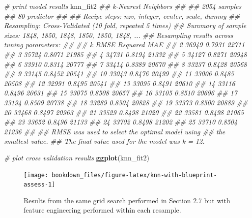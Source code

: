 \documentclass[]{krantz}
\makeatletter
\newenvironment{Shaded}{\begin{snugshade}}{\end{snugshade}}
\newcommand{\CommentTok}[1]{\textcolor[rgb]{0.37,0.37,0.37}{\textit{#1}}}
\newcommand{\KeywordTok}[1]{\textcolor[rgb]{0.27,0.27,0.27}{\textbf{#1}}}
\newcommand{\NormalTok}[1]{#1}
\newenvironment{kframe}{%
\medskip{}
\setlength{\fboxsep}{.8em}
 \def\at@end@of@kframe{}%
 \ifinner\ifhmode%
  \def\at@end@of@kframe{\end{minipage}}%
  \begin{minipage}{\columnwidth}%
 \fi\fi%
 \def\FrameCommand##1{\hskip\@totalleftmargin \hskip-\fboxsep
 \colorbox{shadecolor}{##1}\hskip-\fboxsep
     \hskip-\linewidth \hskip-\@totalleftmargin \hskip\columnwidth}%
 \MakeFramed {\advance\hsize-\width
   \@totalleftmargin\z@ \linewidth\hsize
   \@setminipage}}%
 {\par\unskip\endMakeFramed%
 \at@end@of@kframe}
\renewenvironment{Shaded}{\begin{kframe}}{\end{kframe}}
\makeatother
\begin{document}
\begin{Shaded}
\begin{Highlighting}[]
\CommentTok{# print model results}
\NormalTok{knn_fit2}
\CommentTok{## k-Nearest Neighbors }
\CommentTok{## }
\CommentTok{## 2054 samples}
\CommentTok{##   80 predictor}
\CommentTok{## }
\CommentTok{## Recipe steps: nzv, integer, center, scale, dummy }
\CommentTok{## Resampling: Cross-Validated (10 fold, repeated 5 times) }
\CommentTok{## Summary of sample sizes: 1848, 1850, 1848, 1850, 1850, 1848, ... }
\CommentTok{## Resampling results across tuning parameters:}
\CommentTok{## }
\CommentTok{##   k   RMSE   Rsquared  MAE  }
\CommentTok{##    2  36949  0.7931    22711}
\CommentTok{##    3  35724  0.8071    21985}
\CommentTok{##    4  34731  0.8194    21332}
\CommentTok{##    5  34127  0.8271    20948}
\CommentTok{##    6  33910  0.8314    20777}
\CommentTok{##    7  33414  0.8389    20670}
\CommentTok{##    8  33237  0.8428    20568}
\CommentTok{##    9  33145  0.8452    20541}
\CommentTok{##   10  33043  0.8476    20499}
\CommentTok{##   11  33006  0.8485    20508}
\CommentTok{##   12  32991  0.8495    20541}
\CommentTok{##   13  33095  0.8491    20610}
\CommentTok{##   14  33116  0.8496    20631}
\CommentTok{##   15  33075  0.8508    20657}
\CommentTok{##   16  33105  0.8510    20696}
\CommentTok{##   17  33194  0.8509    20738}
\CommentTok{##   18  33289  0.8504    20828}
\CommentTok{##   19  33373  0.8500    20889}
\CommentTok{##   20  33468  0.8497    20963}
\CommentTok{##   21  33529  0.8498    21020}
\CommentTok{##   22  33581  0.8498    21065}
\CommentTok{##   23  33652  0.8496    21133}
\CommentTok{##   24  33702  0.8498    21202}
\CommentTok{##   25  33710  0.8504    21236}
\CommentTok{## }
\CommentTok{## RMSE was used to select the optimal model using}
\CommentTok{##  the smallest value.}
\CommentTok{## The final value used for the model was k = 12.}

\CommentTok{# plot cross validation results}
\KeywordTok{ggplot}\NormalTok{(knn_fit2)}
\end{Highlighting}
\end{Shaded}

\begin{figure}

{\centering \texttt{[image: bookdown\_files/figure-latex/knn-with-blueprint-assess-1]} 

}

\caption{Results from the same grid search performed in Section 2.7 but with feature engineering performed within each resample.}\label{fig:knn-with-blueprint-assess}
\end{figure}
\end{document}
